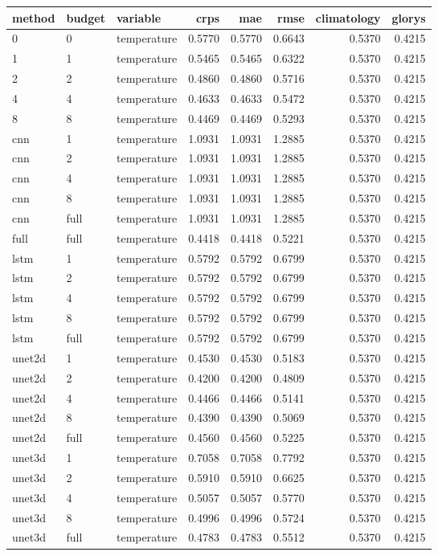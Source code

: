 \begin{tabular}{lllrrrrr}
\toprule
method & budget & variable & crps & mae & rmse & climatology & glorys \\
\midrule
0 & 0 & temperature & 0.5770 & 0.5770 & 0.6643 & 0.5370 & 0.4215 \\
1 & 1 & temperature & 0.5465 & 0.5465 & 0.6322 & 0.5370 & 0.4215 \\
2 & 2 & temperature & 0.4860 & 0.4860 & 0.5716 & 0.5370 & 0.4215 \\
4 & 4 & temperature & 0.4633 & 0.4633 & 0.5472 & 0.5370 & 0.4215 \\
8 & 8 & temperature & 0.4469 & 0.4469 & 0.5293 & 0.5370 & 0.4215 \\
cnn & 1 & temperature & 1.0931 & 1.0931 & 1.2885 & 0.5370 & 0.4215 \\
cnn & 2 & temperature & 1.0931 & 1.0931 & 1.2885 & 0.5370 & 0.4215 \\
cnn & 4 & temperature & 1.0931 & 1.0931 & 1.2885 & 0.5370 & 0.4215 \\
cnn & 8 & temperature & 1.0931 & 1.0931 & 1.2885 & 0.5370 & 0.4215 \\
cnn & full & temperature & 1.0931 & 1.0931 & 1.2885 & 0.5370 & 0.4215 \\
full & full & temperature & 0.4418 & 0.4418 & 0.5221 & 0.5370 & 0.4215 \\
lstm & 1 & temperature & 0.5792 & 0.5792 & 0.6799 & 0.5370 & 0.4215 \\
lstm & 2 & temperature & 0.5792 & 0.5792 & 0.6799 & 0.5370 & 0.4215 \\
lstm & 4 & temperature & 0.5792 & 0.5792 & 0.6799 & 0.5370 & 0.4215 \\
lstm & 8 & temperature & 0.5792 & 0.5792 & 0.6799 & 0.5370 & 0.4215 \\
lstm & full & temperature & 0.5792 & 0.5792 & 0.6799 & 0.5370 & 0.4215 \\
unet2d & 1 & temperature & 0.4530 & 0.4530 & 0.5183 & 0.5370 & 0.4215 \\
unet2d & 2 & temperature & 0.4200 & 0.4200 & 0.4809 & 0.5370 & 0.4215 \\
unet2d & 4 & temperature & 0.4466 & 0.4466 & 0.5141 & 0.5370 & 0.4215 \\
unet2d & 8 & temperature & 0.4390 & 0.4390 & 0.5069 & 0.5370 & 0.4215 \\
unet2d & full & temperature & 0.4560 & 0.4560 & 0.5225 & 0.5370 & 0.4215 \\
unet3d & 1 & temperature & 0.7058 & 0.7058 & 0.7792 & 0.5370 & 0.4215 \\
unet3d & 2 & temperature & 0.5910 & 0.5910 & 0.6625 & 0.5370 & 0.4215 \\
unet3d & 4 & temperature & 0.5057 & 0.5057 & 0.5770 & 0.5370 & 0.4215 \\
unet3d & 8 & temperature & 0.4996 & 0.4996 & 0.5724 & 0.5370 & 0.4215 \\
unet3d & full & temperature & 0.4783 & 0.4783 & 0.5512 & 0.5370 & 0.4215 \\
\bottomrule
\end{tabular}
